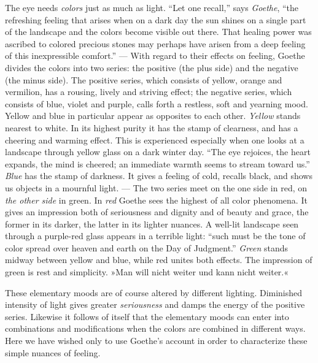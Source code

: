\documentclass[12pt,a4paper]{book}
\newcommand{\opage}[1]{\marginnote{\footnotesize\textit{[#1]}}}
\begin{document}
The eye needs \emph{colors} just as much as light. ``Let one recall,''
says \emph{Goethe}, ``the refreshing feeling that arises when on a dark
day the sun shines on a single part of the landscape and the colors
become visible out there. That healing power was ascribed to colored
precious stones may perhaps have arisen from a deep feeling of this
inexpressible comfort.'' --- With regard to their effects on feeling,
Goethe divides the colors into two series: the positive (the plus side)
and the negative (the minus side). The positive series, which consists
of yellow, orange and vermilion, has a rousing, lively and striving
effect; the negative series, which consists of blue, violet and purple,
calls forth a restless, soft and yearning mood. Yellow and blue in
particular appear as opposites to each other. \emph{Yellow} stands
nearest to white. In its highest purity it has the stamp of clearness,
and has a cheering and warming effect. This is experienced especially
when one looks at a landscape through yellow glass on a dark winter day.
``The eye rejoices, the heart expands, the mind is cheered; an immediate
warmth seems to stream toward us.'' \emph{Blue} has the stamp of
darkness. It gives a feeling of cold, recalls black, and shows us
objects in a mournful light. --- The two series meet on the one side in
red, on \emph{the other side} in green. In \emph{red} Goethe sees the
highest of all color phenomena. It gives an impression both of
seriousness and dignity and of beauty and grace, the former in its
darker, the latter in its lighter nuances. A well-lit landscape seen
through a purple-red glass appears in a terrible light: ``such must be
the tone of color spread over heaven and earth on the Day of
Judgment.'' \emph{Green} stands midway between yellow and blue, while
red unites both effects. The impression of green is rest and
simplicity. »Man will nicht weiter und kann nicht weiter.«

These elementary moods are of course altered by different lighting.
Diminished intensity of light gives greater \emph{seriousness} and damps
the energy of the positive series. Likewise it follows
\opage{279}of itself that the elementary moods can enter into
combinations and modifications when the colors are combined in different
ways. Here we have wished only to use Goethe's account in order to
characterize these simple nuances of feeling.
\end{document}

